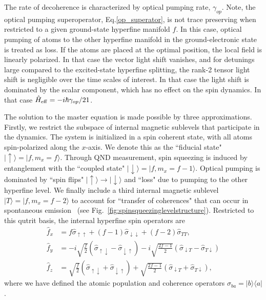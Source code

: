 \documentclass[preprint,aps,pra,onecolumn,superscriptaddress]{revtex4-1} %
\def\bra#1{\langle{#1}\rvert}%
\def\ket#1{\lvert{#1}\rangle}%
\begin{document}
The rate of decoherence is characterized by optical pumping rate, $\gamma_{op}$.  Note, the optical pumping superoperator, Eq.\eqref{op_superator},  is not trace preserving when restricted to a given ground-state hyperfine manifold $f$.  In this case, optical pumping of atoms to the other hyperfine manifold in the ground-electronic state is treated as loss.  If the atoms are placed at the optimal position, the local field is linearly polarized.  In that case the vector light shift vanishes, and for detunings large compared to the excited-state hyperfine splitting, the rank-2 tensor light shift is negligible over the time scales of interest.  In that case the light shift is dominated by the scalar component, which has no effect on the spin dynamics.  In that case $\hat{H}_{\rm eff} = -i\hbar \gamma_{op}/2 1$.

The solution to the master equation is made possible by three approximations. Firstly, we restrict the subspace of internal magnetic sublevels that participate in the dynamics.  The system is initialized in a spin coherent state, with all atoms spin-polarized along the $x$-axis.  We denote this as the ``fiducial state" $\ket{\uparrow} = \ket{f, m_x =f}$.   Through QND measurement, spin squeezing is induced by entanglement with the  ``coupled state"  $\ket{\downarrow} = \ket{f, m_x=f-1}$.  Optical pumping is dominated by ``spin flips" $\ket{\uparrow}\rightarrow \ket{\downarrow}$ and ``loss" due to pumping to the other hyperfine level.  We finally include a third internal magnetic sublevel $\ket{T} = \ket{f, m_x=f-2}$ to account for  ``transfer of coherences" that can occur in spontaneous emission~\cite{Norris2012Enhanced,Norris2014} (see Fig.~\ref{fig:spinsqueezinglevelstructure}).  Restricted to this qutrit basis, the internal hyperfine spin operators are
\begin{subequations}\label{eq:f_in_xbasis}
\begin{align}
\hat{f}_x &= f \hat{\sigma}_{\uparrow \uparrow} +(f-1) \hat{\sigma}_{\downarrow \downarrow} + (f-2)  \hat{\sigma}_{T T}, \\
\hat{f}_y &=-i \sqrt{\frac{f}{2}} \left(\hat{\sigma}_{\uparrow \downarrow} - \hat{\sigma}_{\downarrow \uparrow}\right) -i \sqrt{\frac{2f-1}{2}}  \left(\hat{\sigma}_{\downarrow T} - \hat{\sigma}_{T \downarrow }\right) \\
\hat{f}_z &= \sqrt{\frac{f}{2}} \left(\hat{\sigma}_{\uparrow \downarrow} + \hat{\sigma}_{\downarrow \uparrow}\right) + \sqrt{\frac{2f-1}{2}}  \left(\hat{\sigma}_{\downarrow T} + \hat{\sigma}_{T \downarrow }\right),
\end{align}
\end{subequations}
where we have defined the atomic population and coherence operators $\hat{\sigma}_{ba}=\ket{b}\bra{a}$.
\end{document}
